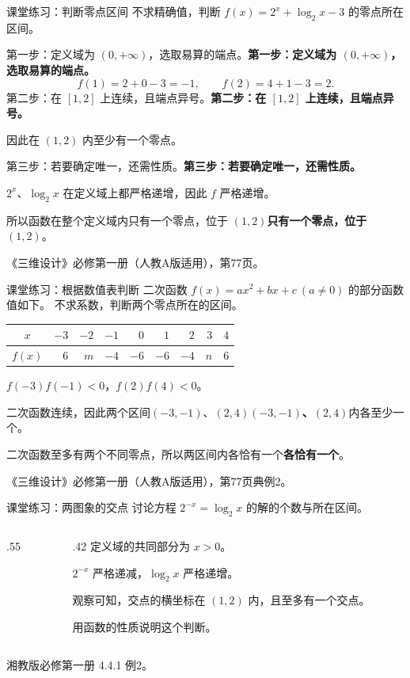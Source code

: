 \documentclass[aspectratio=169,10pt,handout]{beamer}
\newcommand{\key}[1]{{\ifmmode#1\else\bfseries #1\fi}}
\newcommand{\src}[1]{\par\vfill{\color{gray}\scriptsize #1}\par}
\newcommand{\gap}{\par\vspace{2mm}}
\begin{document}
\begin{frame}[t]{课堂练习：判断零点区间}
  \large
  不求精确值，判断 $f(x)=2^x+\log_2x-3$ 的零点所在区间。
  \pause
  \gap
  \key{第一步：定义域为 $(0,+\infty)$，选取易算的端点。}
  \[f(1)=2+0-3=-1,\qquad f(2)=4+1-3=2.\]
  \pause
  \key{第二步：在 $[1,2]$ 上连续，且端点异号。}
  \gap 因此在 $(1,2)$ 内至少有一个零点。
  \pause
  \gap
  \key{第三步：若要确定唯一，还需性质。}
  \gap $2^x$、$\log_2x$ 在定义域上都严格递增，因此 $f$ 严格递增。
  \gap 所以函数在整个定义域内\key{只有一个零点，位于 $(1,2)$}。
  \src{《三维设计》必修第一册（人教A版适用），第77页。}
\end{frame}

\begin{frame}[t]{课堂练习：根据数值表判断}
  \large
  二次函数 $f(x)=ax^2+bx+c\ (a\ne0)$ 的部分函数值如下。
  不求系数，判断两个零点所在的区间。
  \gap\centering
  \begin{tabular}{c|rrrrrrrr}\toprule
    $x$&$-3$&$-2$&$-1$&$0$&$1$&$2$&$3$&$4$\\\midrule
    $f(x)$&$6$&$m$&$-4$&$-6$&$-6$&$-4$&$n$&$6$\\\bottomrule
  \end{tabular}
  \pause
  \gap\raggedright
  $f(-3)f(-1)<0$，$f(2)f(4)<0$。
  \gap 二次函数连续，因此两个区间\key{$(-3,-1)$、$(2,4)$}内各至少一个。
  \pause
  \gap 二次函数至多有两个不同零点，所以两区间内\key{各恰有一个}。
  \src{《三维设计》必修第一册（人教A版适用），第77页典例2。}
\end{frame}

\begin{frame}[t]{课堂练习：两图象的交点}
  讨论方程 $2^{-x}=\log_2x$ 的解的个数与所在区间。
  \begin{columns}[T,onlytextwidth]
  \begin{column}{.55\textwidth}
    \centering
  \end{column}
  \begin{column}{.42\textwidth}
    \large
    定义域的共同部分为 $x>0$。
    \gap
    $2^{-x}$ 严格递减，$\log_2x$ 严格递增。
    \pause
    \gap
    观察可知，交点的横坐标在 $(1,2)$ 内，且至多有一个交点。
    \gap
    用函数的性质说明这个判断。
  \end{column}
  \end{columns}
  \src{湘教版必修第一册 4.4.1 例2。}
\end{frame}
\end{document}
